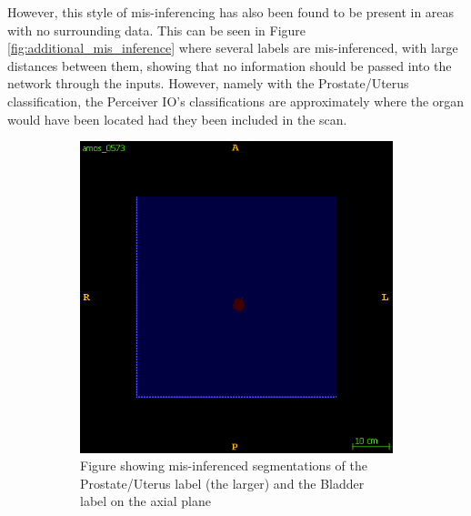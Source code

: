 \documentclass{l4proj}
\begin{document}
However, this style of mis-inferencing has also been found to be present in areas with no surrounding data. This can be seen in Figure \ref{fig:additional_mis_inference} where several labels are mis-inferenced, with large distances between them, showing that no information should be passed into the network through the inputs. However, namely with the Prostate/Uterus classification, the Perceiver IO’s classifications are approximately where the organ would have been located had they been included in the scan.

\begin{figure}[htb] 
    \centering

    \begin{subfigure}[b]{0.45\textwidth}
        \includegraphics[width=\textwidth]{images/ghost_1.png}
        \caption{Figure showing mis-inferenced segmentations of the Prostate/Uterus label (the larger) and the Bladder label on the axial plane}
        \label{fig:additional_mis_inference_ghost_1}
    \end{subfigure}
    ~
    \begin{subfigure}[b]{0.45\textwidth}

\end{subfigure}
\end{figure}
\end{document}
